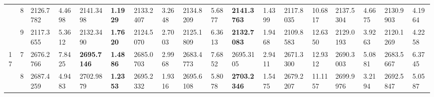 \documentclass[conference]{IEEEtran}
\begin{document}
\begin{table*}[]
\begin{tabular}{|cc|ll|ll|ll|ll|ll|ll|ll|ll|}
		\multicolumn{1}{|c|}{}                            & 8                               & \multicolumn{1}{l|}{2126.7782}         & 4.4698                            & \multicolumn{1}{l|}{2141.3498}          & \textbf{1.1929}                   & \multicolumn{1}{l|}{2133.2407}         & 3.2648                            & \multicolumn{1}{l|}{2134.8209}         & 5.6877                            & \multicolumn{1}{l|}{\textbf{2141.3763}} & 1.4399                            & \multicolumn{1}{l|}{2117.8035}         & 10.6817                           & \multicolumn{1}{l|}{2137.5304}         & 4.6675                            & \multicolumn{1}{l|}{2130.9903}         & 4.1964                            \\ \cline{2-18} 
		\multicolumn{1}{|c|}{}                            & 9                               & \multicolumn{1}{l|}{2117.3655}         & 5.3612                            & \multicolumn{1}{l|}{2132.3490}          & \textbf{1.7620}                   & \multicolumn{1}{l|}{2124.5070}         & 2.7003                            & \multicolumn{1}{l|}{2125.1809}         & 6.3613                            & \multicolumn{1}{l|}{\textbf{2132.7083}} & 1.9468                            & \multicolumn{1}{l|}{2109.8583}         & 12.6350                           & \multicolumn{1}{l|}{2129.0193}         & 3.9263                            & \multicolumn{1}{l|}{2120.1269}         & 4.2258                            \\ \hline
		\multicolumn{1}{|c|}{\multirow{3}{*}{17}}         & 7                               & \multicolumn{1}{l|}{2676.2766}         & 7.8425                            & \multicolumn{1}{l|}{\textbf{2695.7146}} & \textbf{1.4886}                   & \multicolumn{1}{l|}{2685.0703}         & 2.9968                            & \multicolumn{1}{l|}{2683.4773}         & 7.6852                            & \multicolumn{1}{l|}{2695.3105}          & 2.9411                            & \multicolumn{1}{l|}{2671.3300}         & 12.9312                           & \multicolumn{1}{l|}{2690.3003}         & 5.0881                            & \multicolumn{1}{l|}{2683.5667}         & 6.3745                            \\ \cline{2-18} 
		\multicolumn{1}{|c|}{}                            & 8                               & \multicolumn{1}{l|}{2687.4259}         & 4.9483                            & \multicolumn{1}{l|}{2702.9879}          & \textbf{1.2353}                   & \multicolumn{1}{l|}{2695.2332}         & 1.9316                            & \multicolumn{1}{l|}{2695.6108}         & 5.8078                            & \multicolumn{1}{l|}{\textbf{2703.2346}} & 1.5475                            & \multicolumn{1}{l|}{2679.2207}         & 11.1157                           & \multicolumn{1}{l|}{2699.9976}         & 3.2194                            & \multicolumn{1}{l|}{2692.5847}         & 5.0587                            \\ \cline{2-18} 

\end{tabular}
\end{table*}
\end{document}
